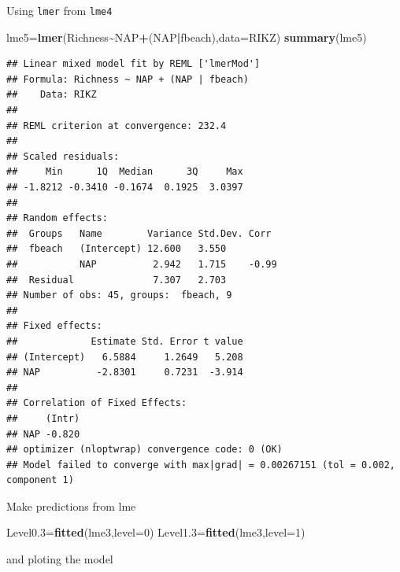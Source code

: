 \documentclass[
]{book}
\newenvironment{Shaded}{\begin{snugshade}}{\end{snugshade}}
\newcommand{\AttributeTok}[1]{\textcolor[rgb]{0.13,0.29,0.53}{#1}}
\newcommand{\DecValTok}[1]{\textcolor[rgb]{0.00,0.00,0.81}{#1}}
\newcommand{\FloatTok}[1]{\textcolor[rgb]{0.00,0.00,0.81}{#1}}
\newcommand{\FunctionTok}[1]{\textcolor[rgb]{0.13,0.29,0.53}{\textbf{#1}}}
\newcommand{\NormalTok}[1]{#1}
\newcommand{\OtherTok}[1]{\textcolor[rgb]{0.56,0.35,0.01}{#1}}
\newcommand{\SpecialCharTok}[1]{\textcolor[rgb]{0.81,0.36,0.00}{\textbf{#1}}}
\begin{document}
Using \texttt{lmer} from \texttt{lme4}

\begin{Shaded}
\begin{Highlighting}[]
\NormalTok{lme5}\OtherTok{=}\FunctionTok{lmer}\NormalTok{(Richness}\SpecialCharTok{\textasciitilde{}}\NormalTok{NAP}\SpecialCharTok{+}\NormalTok{(NAP}\SpecialCharTok{|}\NormalTok{fbeach),}\AttributeTok{data=}\NormalTok{RIKZ)}
\FunctionTok{summary}\NormalTok{(lme5)}
\end{Highlighting}
\end{Shaded}

\begin{verbatim}
## Linear mixed model fit by REML ['lmerMod']
## Formula: Richness ~ NAP + (NAP | fbeach)
##    Data: RIKZ
## 
## REML criterion at convergence: 232.4
## 
## Scaled residuals: 
##     Min      1Q  Median      3Q     Max 
## -1.8212 -0.3410 -0.1674  0.1925  3.0397 
## 
## Random effects:
##  Groups   Name        Variance Std.Dev. Corr 
##  fbeach   (Intercept) 12.600   3.550         
##           NAP          2.942   1.715    -0.99
##  Residual              7.307   2.703         
## Number of obs: 45, groups:  fbeach, 9
## 
## Fixed effects:
##             Estimate Std. Error t value
## (Intercept)   6.5884     1.2649   5.208
## NAP          -2.8301     0.7231  -3.914
## 
## Correlation of Fixed Effects:
##     (Intr)
## NAP -0.820
## optimizer (nloptwrap) convergence code: 0 (OK)
## Model failed to converge with max|grad| = 0.00267151 (tol = 0.002, component 1)
\end{verbatim}

Make predictions from lme

\begin{Shaded}
\begin{Highlighting}[]
\NormalTok{Level0}\FloatTok{.3}\OtherTok{=}\FunctionTok{fitted}\NormalTok{(lme3,}\AttributeTok{level=}\DecValTok{0}\NormalTok{)}
\NormalTok{Level1}\FloatTok{.3}\OtherTok{=}\FunctionTok{fitted}\NormalTok{(lme3,}\AttributeTok{level=}\DecValTok{1}\NormalTok{)}
\end{Highlighting}
\end{Shaded}

and ploting the model
\end{document}
